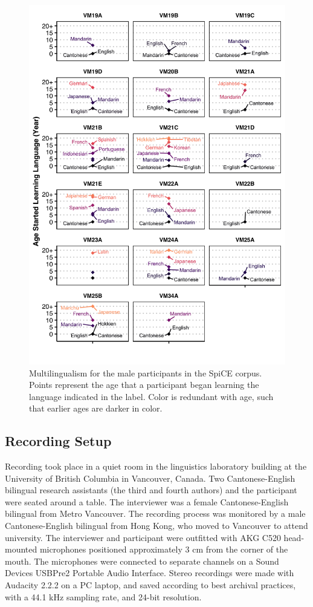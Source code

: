 \begin{figure}[!htbp]
  \begin{center}
  \includegraphics[width=4.5in]{figures/ch2_multilingualism_vm_5in.png} 
  \caption{Multilingualism for the male participants in the SpiCE corpus. Points represent the age that a participant began learning the language indicated in the label. Color is redundant with age, such that earlier ages are darker in color.}
  \label{ch2:fig:multilingualism_vm}
  \end{center}
\end{figure}

\subsection{Recording Setup}\label{ch2:subsec:setup}
Recording took place in a quiet room in the linguistics laboratory building at the University of British Columbia in Vancouver, Canada. Two Cantonese-English bilingual research assistants (the third and fourth authors) and the participant were seated around a table. The interviewer was a female Cantonese-English bilingual from Metro Vancouver. The recording process was monitored by a male Cantonese-English bilingual from Hong Kong, who moved to Vancouver to attend university. The interviewer and participant were outfitted with AKG C520 head-mounted microphones positioned approximately 3 cm from the corner of the mouth. The microphones were connected to separate channels on a Sound Devices USBPre2 Portable Audio Interface. Stereo recordings were made with Audacity 2.2.2 \citep{audacity_2018_audio} on a PC laptop, and saved according to best archival practices, with a 44.1 kHz sampling rate, and 24-bit resolution.

